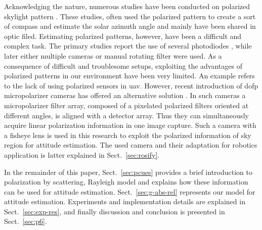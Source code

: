 Acknowledging the nature, numerous studies have been conducted on polarized
skylight pattern \cite{lambrinos2000insectnavigation, chu2009application,
  zhao2009novel, wang2015novel,chahl2013integration, ashkanazy2015bio,
  sturzl2012fisheye, ma2015skylightpolarization,
  miyazaki09sunlightpolarization, wang2014bionic,
  lu2015angle,hamaoui2017polarized}.  These studies, often used the polarized
pattern to create a sort of compass and estimate the solar azimuth angle and
mainly have been shared in optic filed.  Estimating polarized patterns,
however, have been a difficult and complex task.  The primary studies report
the use of several photodiodes \cite{lambrinos2000insectnavigation,
  chu2009application, zhao2009novel, wang2015novel,chahl2013integration}, while
later either multiple cameras \cite{ashkanazy2015bio, sturzl2012fisheye,
  wang2014bionic} or manual rotating filter \cite{ma2015skylightpolarization,
  miyazaki09sunlightpolarization, lu2015angle, hamaoui2017polarized} were used.
As a consequence of difficult and troublesome setups, exploiting the advantages
of polarized patterns in our environment have been very limited. An example
refers to the lack of using polarized sensors in \gls{uav}.  However, recent
introduction of \gls{dofp} micropolarizer cameras has offered an alternative
solution \cite{nordin1999micropolarizer, nordin1999diffractive,
  millerd2006pixelated}.  In such cameras a micropolarizer filter array,
composed of a pixelated polarized filters oriented at different angles, is
aligned with a detector array. Thus they can simultaneously acquire linear
polarization information in one image capture.  Such a camera with a fisheye
lens is used in this research to exploit the polarized information of sky
region for attitude estimation.  The used camera and their adaptation for
robotics application is latter explained in Sect.~\ref{sec:rosify}.

In the remainder of this paper, Sect.~\ref{sec:pcues} provides a brief
introduction to polarization by scattering, Rayleigh model and explains how
these information can be used for attitude estimation. Sect.~\ref{sec:g-abs-rel}
represents our model for attitude estimation. Experiments and implementation
details are explained in Sect.~\ref{sec:exp-res}, and finally discussion and
conclusion is presented in Sect.~\ref{sec:p6}.
























